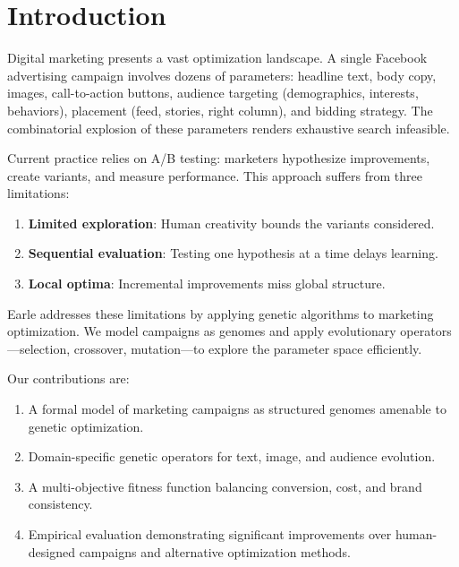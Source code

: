 \section{Introduction}


Digital marketing presents a vast optimization landscape. A single Facebook advertising campaign involves dozens of parameters: headline text, body copy, images, call-to-action buttons, audience targeting (demographics, interests, behaviors), placement (feed, stories, right column), and bidding strategy. The combinatorial explosion of these parameters renders exhaustive search infeasible.

Current practice relies on A/B testing: marketers hypothesize improvements, create variants, and measure performance. This approach suffers from three limitations:

\begin{enumerate}
\item \textbf{Limited exploration}: Human creativity bounds the variants considered.
\item \textbf{Sequential evaluation}: Testing one hypothesis at a time delays learning.
\item \textbf{Local optima}: Incremental improvements miss global structure.
\end{enumerate}

Earle addresses these limitations by applying genetic algorithms to marketing optimization. We model campaigns as genomes and apply evolutionary operators—selection, crossover, mutation—to explore the parameter space efficiently.

Our contributions are:
\begin{enumerate}
\item A formal model of marketing campaigns as structured genomes amenable to genetic optimization.
\item Domain-specific genetic operators for text, image, and audience evolution.
\item A multi-objective fitness function balancing conversion, cost, and brand consistency.
\item Empirical evaluation demonstrating significant improvements over human-designed campaigns and alternative optimization methods.
\end{enumerate}

